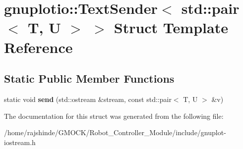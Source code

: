\hypertarget{structgnuplotio_1_1_text_sender_3_01std_1_1pair_3_01_t_00_01_u_01_4_01_4}{}\section{gnuplotio\+:\+:Text\+Sender$<$ std\+:\+:pair$<$ T, U $>$ $>$ Struct Template Reference}
\label{structgnuplotio_1_1_text_sender_3_01std_1_1pair_3_01_t_00_01_u_01_4_01_4}
\subsection*{Static Public Member Functions}
\begin{DoxyCompactItemize}
\item 
static void {\bfseries send} (std\+::ostream \&stream, const std\+::pair$<$ T, U $>$ \&v)\hypertarget{structgnuplotio_1_1_text_sender_3_01std_1_1pair_3_01_t_00_01_u_01_4_01_4_ae1f3a6ffd8a60bb73d787578327154d1}{}\label{structgnuplotio_1_1_text_sender_3_01std_1_1pair_3_01_t_00_01_u_01_4_01_4_ae1f3a6ffd8a60bb73d787578327154d1}

\end{DoxyCompactItemize}


The documentation for this struct was generated from the following file\+:\begin{DoxyCompactItemize}
\item 
/home/rajshinde/\+G\+M\+O\+C\+K/\+Robot\+\_\+\+Controller\+\_\+\+Module/include/gnuplot-\/iostream.\+h\end{DoxyCompactItemize}
